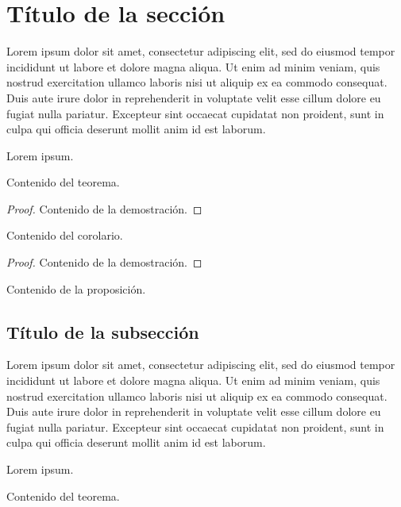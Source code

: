 \section{Título de la sección}

Lorem ipsum dolor sit amet, consectetur adipiscing elit, sed do eiusmod tempor incididunt ut labore et dolore magna aliqua. Ut enim ad minim veniam, quis nostrud exercitation ullamco laboris nisi ut aliquip ex ea commodo consequat. Duis aute irure dolor in reprehenderit in voluptate velit esse cillum dolore eu fugiat nulla pariatur. Excepteur sint occaecat cupidatat non proident, sunt in culpa qui officia deserunt mollit anim id est laborum.

Lorem ipsum.

\begin{teorema}
    Contenido del teorema.
\end{teorema}

\begin{proof}
    Contenido de la demostración.
\end{proof}

\begin{corolario}
    Contenido del corolario.
\end{corolario}

\begin{proof}
    Contenido de la demostración.
\end{proof}

\begin{proposicion}
    Contenido de la proposición.
\end{proposicion}

\subsection{Título de la subsección}

Lorem ipsum dolor sit amet, consectetur adipiscing elit, sed do eiusmod tempor incididunt ut labore et dolore magna aliqua. Ut enim ad minim veniam, quis nostrud exercitation ullamco laboris nisi ut aliquip ex ea commodo consequat. Duis aute irure dolor in reprehenderit in voluptate velit esse cillum dolore eu fugiat nulla pariatur. Excepteur sint occaecat cupidatat non proident, sunt in culpa qui officia deserunt mollit anim id est laborum.

Lorem ipsum.

\begin{teorema}
    Contenido del teorema.
\end{teorema}

